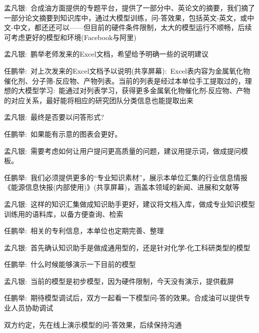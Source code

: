 {孟凡银}:~合成油方面提供的专题平台，提供了一部分中、英论文的摘要，我们摘了一部分论文摘要到知识库中，通过大模型训练，问-答效果，包括英文-英文，或中文-中文，都还还可以——但目前的硬件条件限制，太大的模型运行不顺畅，后续可考虑更好的模型和环境(\textrm{Facebook}与阿里)

{孟凡银}:~鹏举老师发来的\textrm{Excel}文档，希望给予明确一些的说明建议

{任鹏举}:~对上次发来的\textrm{Excel}文档予以说明(共享屏幕):~\textrm{Excel}表内容为金属氧化物催化剂、分子筛-反应物、产物列表。当前的列表是经过本单位手工提取过的，理想的大模型学习:~能通过对列表学习，获得更多金属氧化物催化剂-反应物、产物的对应关系，最好能将相应的研究团队分类信息也能提取出来

{孟凡银}:~最终是否要以问答形式?

{任鹏举}:~如果能有示意的图表会更好。

{孟凡银}:~需要考虑如何让用户提问更高质量的问题，建议用提示词，做成提问模板。

{任鹏举}:~我们必须提供更多的``专业知识素材''，展示本单位汇集的行业信息情报《能源信息快报(内部使用)》(共享屏幕)，涵盖本领域的新闻、进展和文献等

{孟凡银}:~这样的知识汇集做成知识助手更好，建议将文档入库，做成专业知识模型训练用的语料库，以备方便查询、检索

{任鹏举}:~相关的专利信息，本单位也定期完善、整理

{孟凡银}:~首先确认知识助手是做成通用型的，还是针对化学-化工科研类型的模型

{任鹏举}:~什么时候能够演示一下目前的模型

{孟凡银}:~当前的模型是初步模型，因为硬件限制，今天没有演示，提供截屏

{任鹏举}:~期待模型调试后，双方一起看一下模型问-答的效果。合成油可以提供专业人员协助调试


双方约定，先在线上演示模型的问-答效果，后续保持沟通
